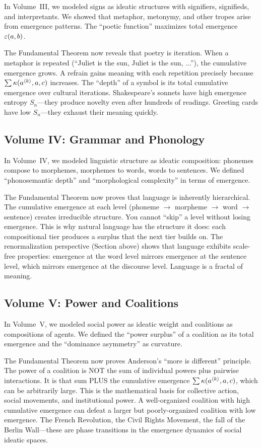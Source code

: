 In Volume~III, we modeled signs as ideatic structures with signifiers, signifieds,
and interpretants. We showed that metaphor, metonymy, and other tropes arise
from emergence patterns. The ``poetic function'' maximizes total emergence
$\varepsilon(a,b)$.

The Fundamental Theorem now reveals that poetry is iteration. When a metaphor
is repeated (``Juliet is the sun, Juliet is the sun, ...''), the cumulative
emergence grows. A refrain gains meaning with each repetition precisely because
$\sum \kappa(a^{\langle k \rangle}, a, c)$ increases. The ``depth'' of a symbol is
its total cumulative emergence over cultural iterations. Shakespeare's sonnets
have high emergence entropy $S_n$---they produce novelty even after hundreds of
readings. Greeting cards have low $S_n$---they exhaust their meaning quickly.

\subsection{Volume IV: Grammar and Phonology}

In Volume~IV, we modeled linguistic structure as ideatic composition: phonemes
compose to morphemes, morphemes to words, words to sentences. We defined
``phonosemantic depth'' and ``morphological complexity'' in terms of emergence.

The Fundamental Theorem now proves that language is inherently hierarchical.
The cumulative emergence at each level (phoneme $\to$ morpheme $\to$ word $\to$
sentence) creates irreducible structure. You cannot ``skip'' a level without
losing emergence. This is why natural language has the structure it does: each
compositional tier produces a surplus that the next tier builds on. The
renormalization perspective (Section above) shows that language exhibits
scale-free properties: emergence at the word level mirrors emergence at the
sentence level, which mirrors emergence at the discourse level. Language is a
fractal of meaning.

\subsection{Volume V: Power and Coalitions}

In Volume~V, we modeled social power as ideatic weight and coalitions as
compositions of agents. We defined the ``power surplus'' of a coalition as its
total emergence and the ``dominance asymmetry'' as curvature.

The Fundamental Theorem now proves Anderson's ``more is different'' principle.
The power of a coalition is NOT the sum of individual powers plus pairwise
interactions. It is that sum PLUS the cumulative emergence $\sum \kappa(a^{\langle k \rangle}, a, c)$,
which can be arbitrarily large. This is the mathematical basis for collective
action, social movements, and institutional power. A well-organized coalition
with high cumulative emergence can defeat a larger but poorly-organized coalition
with low emergence. The French Revolution, the Civil Rights Movement, the fall
of the Berlin Wall---these are phase transitions in the emergence dynamics of
social ideatic spaces.

